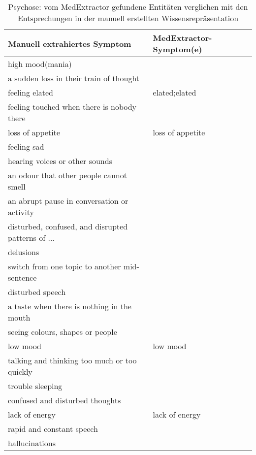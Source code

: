 \begin{table}[H]
\begin{center}
\begin{tabular}{ll}
\toprule
                      Manuell extrahiertes Symptom &       MedExtractor-Symptom(e) \\
\midrule
                                 high mood(mania) &                  \\
           a sudden loss in their train of thought &                  \\
                                    feeling elated &    elated;elated \\
        feeling touched when there is nobody there &                  \\
                                  loss of appetite & loss of appetite \\
                                       feeling sad &                  \\
                    hearing voices or other sounds &                  \\
           an odour that other people cannot smell &                  \\
       an abrupt pause in conversation or activity &                  \\
disturbed, confused, and disrupted patterns of ... &                  \\
                                         delusions &                  \\
     switch from one topic to another mid-sentence &                  \\
                                  disturbed speech &                  \\
        a taste when there is nothing in the mouth &                  \\
                  seeing colours, shapes or people &                  \\
                                          low mood &         low mood \\
      talking and thinking too much or too quickly &                  \\
                                  trouble sleeping &                  \\
                   confused and disturbed thoughts &                  \\
                                    lack of energy &   lack of energy \\
                         rapid and constant speech &                  \\
                                    hallucinations &                  \\
\bottomrule
\end{tabular}
\caption{Psychose: vom MedExtractor gefundene Entitäten verglichen mit den Entsprechungen in der manuell erstellten Wissensrepräsentation}
\label{tab:psychosis_medextractor_manuell}
\end{center}
\end{table}

